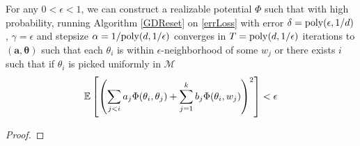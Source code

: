 \begin{theorem}
For any $0 < \epsilon < 1$, we can construct a realizable potential $\Phi$ such that with high probability, running Algorithm \ref{GDReset} on \eqref{errLoss} with error $\delta = \mathrm{poly}(\epsilon,1/d)$, $\gamma = \epsilon$ and stepsize $\alpha = 1/\mathrm{poly}(d,1/\epsilon)$ converges in $T = \mathrm{poly}(d, 1/\epsilon)$ iterations to $(\boldsymbol{a,\theta})$ such that each $\theta_i$ is within $\epsilon$-neighborhood of some $w_j$ or there exists $i$ such that if $\theta_i$ is picked uniformly in $\mathcal{M}$
%
\[ \operatorname*{\mathbb{E}}\left[\left( \sum_{j < i} a_j \Phi(\theta_i,\theta_j) + \sum_{j=1}^k b_j \Phi(\theta_i,w_j)\right)^2\right] < \epsilon\]
\end{theorem}

\begin{proof}


\end{proof}
\fi
